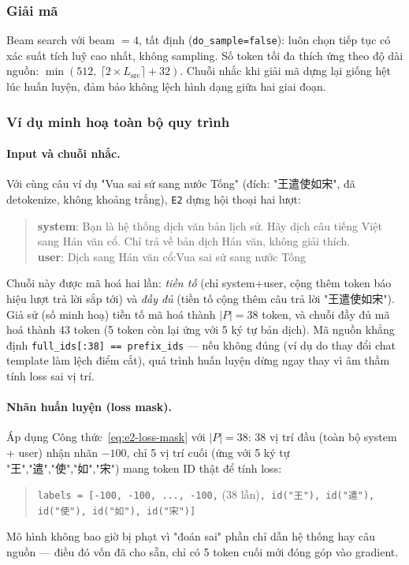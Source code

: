 \subsubsection{Giải mã}

Beam search với beam $=4$, tất định (\texttt{do\_sample=false}): luôn chọn tiếp tục có
xác suất tích luỹ cao nhất, không sampling. Số token tối đa thích ứng theo độ dài nguồn:
$\min(512,\ \lceil 2\times L_{\text{src}}\rceil + 32)$. Chuỗi nhắc khi giải mã dựng lại
giống hệt lúc huấn luyện, đảm bảo không lệch hình dạng giữa hai giai đoạn.

\subsubsection{Ví dụ minh hoạ toàn bộ quy trình}

\paragraph{Input và chuỗi nhắc.} Với cùng câu ví dụ "Vua sai sứ sang nước Tống" (đích:
"王遣使如宋", đã detokenize, không khoảng trắng), \texttt{E2} dựng hội thoại hai lượt:
\begin{quote}\small
\textbf{system}: Bạn là hệ thống dịch văn bản lịch sử. Hãy dịch câu tiếng Việt sang Hán
văn cổ. Chỉ trả về bản dịch Hán văn, không giải thích. \\
\textbf{user}: Dịch sang Hán văn cổ:\newline Vua sai sứ sang nước Tống
\end{quote}
Chuỗi này được mã hoá hai lần: \emph{tiền tố} (chỉ system+user, cộng thêm token báo hiệu
lượt trả lời sắp tới) và \emph{đầy đủ} (tiền tố cộng thêm câu trả lời "王遣使如宋"). Giả
sử (số minh hoạ) tiền tố mã hoá thành $|P|=38$ token, và chuỗi đầy đủ mã hoá thành 43
token (5 token còn lại ứng với 5 ký tự bản dịch). Mã nguồn khẳng định
\texttt{full\_ids[:38] == prefix\_ids} — nếu không đúng (ví dụ do thay đổi chat template
làm lệch điểm cắt), quá trình huấn luyện dừng ngay thay vì âm thầm tính loss sai vị trí.

\paragraph{Nhãn huấn luyện (loss mask).} Áp dụng Công thức~\ref{eq:e2-loss-mask} với
$|P|=38$: 38 vị trí đầu (toàn bộ system + user) nhận nhãn $-100$, chỉ 5 vị trí cuối (ứng
với 5 ký tự "王","遣","使","如","宋") mang token ID thật để tính loss:
\begin{quote}\small
\texttt{labels = [-100, -100, ..., -100,} (38 lần)\texttt{, id("王"), id("遣"), id("使"), id("如"), id("宋")]}
\end{quote}
Mô hình không bao giờ bị phạt vì "đoán sai" phần chỉ dẫn hệ thống hay câu nguồn — điều
đó vốn đã cho sẵn, chỉ có 5 token cuối mới đóng góp vào gradient.

